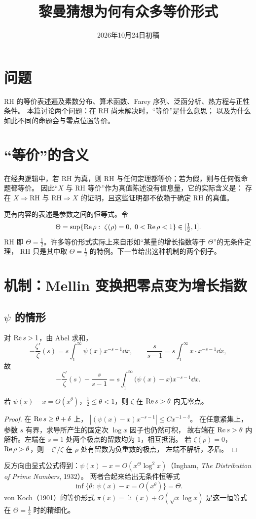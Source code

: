 \documentclass[11pt]{article}
\date{2026年10月24日初稿}
\title{黎曼猜想为何有众多等价形式}
\begin{document}
\maketitle

\par\medskip

\section{问题}
RH 的等价表述遍及素数分布、算术函数、Farey 序列、泛函分析、热方程与正性条件。
本篇讨论两个问题：在 RH 尚未解决时，“等价”是什么意思；
以及为什么如此不同的命题会与零点位置等价。

\section{“等价”的含义}
在经典逻辑中，若 RH 为真，则 RH 与任何定理都等价；若为假，则与任何假命题都等价。
因此“$X$ 与 RH 等价”作为真值陈述没有信息量，它的实际含义是：
存在 $X\Rightarrow\mathrm{RH}$ 与 $\mathrm{RH}\Rightarrow X$ 的证明，且这些证明都不依赖于确定 RH 的真值。

更有内容的表述是参数之间的恒等式。令
\[
 \Theta=\sup\{\Rea\rho:\ \zeta(\rho)=0,\ 0<\Rea\rho<1\}\in[\tfrac12,1].
\]
RH 即 $\Theta=\tfrac12$。许多等价形式实际上来自形如“某量的增长指数等于 $\Theta$”的无条件定理，
RH 只是其中取 $\Theta=\tfrac12$ 的特例。下一节给出这种机制的两个例子。

\section{机制：Mellin 变换把零点变为增长指数}
\subsection{\texorpdfstring{$\psi$ 的情形}{psi 的情形}}
对 $\operatorname{Re} s>1$，由 Abel 求和，
\[
 -\frac{\zeta'}{\zeta}(s)=s\int_1^\infty\psi(x)x^{-s-1}\dd x,\qquad
 \frac{s}{s-1}=s\int_1^\infty x\cdot x^{-s-1}\dd x,
\]
故
\[
 -\frac{\zeta'}{\zeta}(s)-\frac{s}{s-1}=s\int_1^\infty\bigl(\psi(x)-x\bigr)x^{-s-1}\dd x .  \tag{3.1}
\]
\begin{proposition}\label{prop:psi}
若 $\psi(x)-x=O(x^\theta)$，$\tfrac12\le\theta<1$，则 $\zeta$ 在 $\operatorname{Re} s>\theta$ 内无零点。
\end{proposition}
\begin{proof}
在 $\operatorname{Re} s\ge\theta+\delta$ 上，
$|(\psi(x)-x)x^{-s-1}|\le Cx^{-1-\delta}$。
在任意紧集上，参数 $s$ 有界，求导所产生的固定次 $\log x$ 因子也仍然可积，
故右端在 $\operatorname{Re} s>\theta$ 内解析。左端在 $s=1$ 处两个极点的留数均为 $1$，相互抵消。
若 $\zeta(\rho)=0$，$\operatorname{Re}\rho>\theta$，则 $-\zeta'/\zeta$ 在 $\rho$ 处有留数为负重数的极点，
左端不解析，矛盾。
\end{proof}
反方向由显式公式得到：$\psi(x)-x=O(x^\Theta\log^2x)$（Ingham, \emph{The Distribution of Prime Numbers}, 1932）。
两者合起来给出无条件恒等式
\[
 \inf\{\theta:\ \psi(x)-x=O(x^\theta)\}=\Theta .
\]
von Koch（1901）的等价形式 $\pi(x)=\operatorname{li}(x)+O(\sqrt x\log x)$ 是这一恒等式在 $\Theta=\tfrac12$ 时的精细化。
\end{document}
